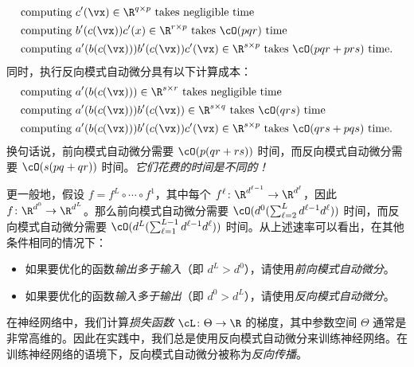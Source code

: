 \documentclass[../../book-main_zh.tex]{subfiles}
\begin{document}
\begin{align}
    &\text{computing}\ c^{\prime}(\vx) \in \R^{q \times
    p}\ \text{takes negligible time} \\
    &\text{computing}\ b^{\prime}(c(\vx))c^{\prime}(x) \in \R^{r
    \times p}\ \text{takes \(\cO(pqr)\) time} \\
    &\text{computing}\ a^{\prime}(b(c(\vx)))b^{\prime}(c(\vx))c^{\prime}(\vx)
    \in \R^{s \times p}\ \text{takes \(\cO(pqr + prs)\) time.}
\end{align}
同时，执行反向模式自动微分具有以下计算成本：
\begin{align}
    &\text{computing}\ a^{\prime}(b(c(\vx))) \in \R^{s \times
    r}\ \text{takes negligible time} \\
    &\text{computing}\ a^{\prime}(b(c(\vx)))b^{\prime}(c(\vx)) \in
    \R^{s \times q}\ \text{takes \(\cO(qrs)\) time} \\
    &\text{computing}\ a^{\prime}(b(c(\vx)))b^{\prime}(c(\vx))c^{\prime}(\vx)
    \in \R^{s \times p}\ \text{takes \(\cO(qrs + pqs)\) time.}
\end{align}
换句话说，前向模式自动微分需要 \(\cO(p(qr + rs))\) 时间，而反向模式自动微分需要 \(\cO(s(pq + qr))\) 时间。\textit{它们花费的时间是不同的！}

更一般地，假设 \(f = f^{L} \circ \cdots \circ f^{1}\)，其中每个 \(f^{\ell} \colon \R^{d^{\ell - 1}} \to \R^{d^{\ell}}\)，因此 \(f \colon \R^{d^{0}} \to \R^{d^{L}}\)。那么前向模式自动微分需要 \(\cO(d^{0}(\sum_{\ell = 2}^{L}d^{\ell - 1}d^{\ell}))\) 时间，而反向模式自动微分需要 \(\cO(d^{L}(\sum_{\ell = 1}^{L -
1}d^{\ell - 1}d^{\ell}))\) 时间。从上述速率可以看出，在其他条件相同的情况下：
\begin{itemize}
    \item 如果要优化的函数\textit{输出多于输入}（即 \(d^{L} > d^{0}\)），请使用\textit{前向模式自动微分}。
    \item 如果要优化的函数\textit{输入多于输出}（即 \(d^{0} > d^{L}\)），请使用\textit{反向模式自动微分}。
\end{itemize}
在神经网络中，我们计算\textit{损失函数} \(\cL \colon \Theta \to \R\) 的梯度，其中参数空间 \(\Theta\) 通常是非常高维的。因此在实践中，我们总是使用反向模式自动微分来训练神经网络。在训练神经网络的语境下，反向模式自动微分被称为\textit{反向传播}。
\end{document}
